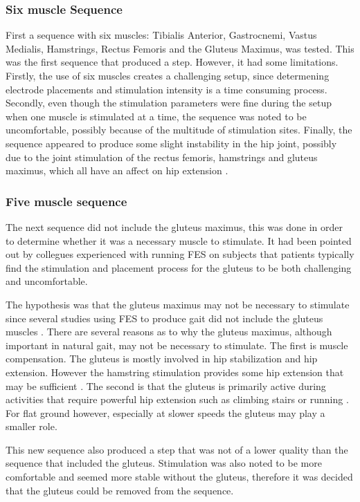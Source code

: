 \subsubsection{Six muscle Sequence}

First a sequence with six muscles: Tibialis Anterior, Gastrocnemi, Vastus Medialis, Hamstrings, Rectus Femoris and the Gluteus Maximus, was tested. This was the first sequence that produced a step. However, it had some limitations. Firstly, the use of six muscles creates a challenging setup, since determening electrode placements and stimulation intensity is a time consuming process. Secondly, even though the stimulation parameters were fine during the setup when one muscle is stimulated at a time, the sequence was noted to be uncomfortable, possibly because of the multitude of stimulation sites. Finally, the sequence appeared to produce some slight instability in the hip joint, possibly due to the joint stimulation of the rectus femoris, hamstrings and gluteus maximus, which all have an affect on hip extension .

\subsubsection{Five muscle sequence}
The next sequence did not include the gluteus maximus, this was done in order to determine whether it was a necessary muscle to stimulate. It had been pointed out by collegues experienced with running FES on subjects that patients typically find the stimulation and placement process for the gluteus to be both challenging and uncomfortable. 

The hypothesis was that the gluteus maximus may not be necessary to stimulate since several studies using FES to produce gait did not include the gluteus muscles \cite{aout_effects_2023}. There are several reasons as to why the gluteus maximus, although important in natural gait, may not be necessary to stimulate. The first is muscle compensation. The gluteus is mostly involved in hip stabilization and hip extension. However the hamstring stimulation provides some hip extension that may be sufficient \cite{kang_activation_2013}. The second is that the gluteus is primarily active during activities that require powerful hip extension such as climbing stairs or running \cite{noauthor_gluteus_nodate}. For flat ground however, especially at slower speeds the gluteus may play a smaller role. 

This new sequence also produced a step that was not of a lower quality than the sequence that included the gluteus. Stimulation was also noted to be more comfortable and seemed more stable without the gluteus, therefore it was decided that the gluteus could be removed from the sequence.



